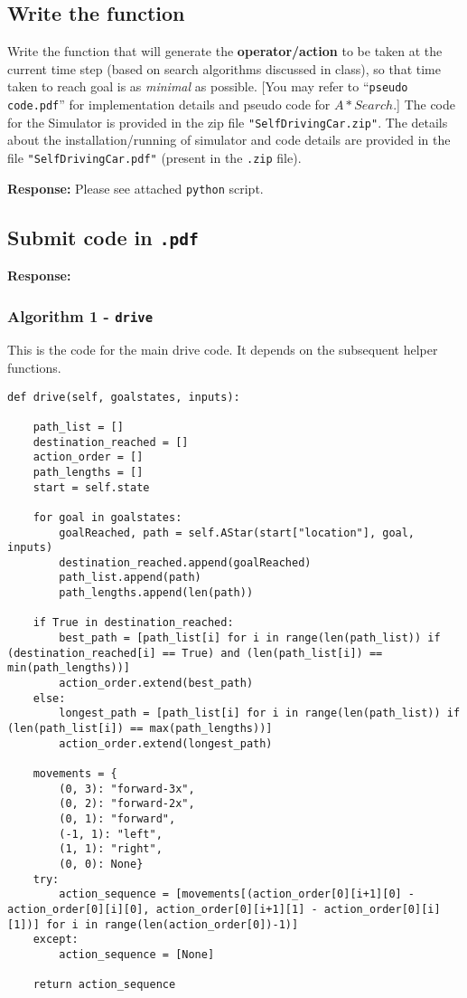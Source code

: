 \documentclass[12pt, letterpaper]{article}
\newcommand{\mybox}[1]{\par\noindent\colorbox{shadecolor}
{\parbox{\dimexpr\textwidth-2\fboxsep\relax}{#1}}}
\begin{document}
\subsection{Write the function}
\mybox{Write the function that will generate the \textbf{operator/action} to be taken at the current time step (based on search algorithms discussed in class), so that time taken to reach goal is as \textit{minimal} as possible. 
[You may refer to “\texttt{pseudo code.pdf}” for implementation details and pseudo code for $A* Search$.]
The code for the Simulator is provided in the zip file \texttt{"SelfDrivingCar.zip"}. The details about the
installation/running of simulator and code details are provided in the file \texttt{"SelfDrivingCar.pdf"}
(present in the \texttt{.zip} file).}

\textbf{Response:} Please see attached \texttt{python} script.

\subsection{Submit code in \texttt{.pdf}}

\textbf{Response:}

\subsubsection{Algorithm 1 - \texttt{drive}}

This is the code for the main drive code. It depends on the subsequent helper functions.

\begin{mdframed}[backgroundcolor=shadecolor]
\begin{verbatim}
def drive(self, goalstates, inputs):    
    
    path_list = []
    destination_reached = []
    action_order = []
    path_lengths = []
    start = self.state

    for goal in goalstates:
        goalReached, path = self.AStar(start["location"], goal, inputs)
        destination_reached.append(goalReached)
        path_list.append(path)
        path_lengths.append(len(path))
    
    if True in destination_reached:        
        best_path = [path_list[i] for i in range(len(path_list)) if (destination_reached[i] == True) and (len(path_list[i]) == min(path_lengths))]
        action_order.extend(best_path)
    else:        
        longest_path = [path_list[i] for i in range(len(path_list)) if (len(path_list[i]) == max(path_lengths))]
        action_order.extend(longest_path)

    movements = {
        (0, 3): "forward-3x", 
        (0, 2): "forward-2x", 
        (0, 1): "forward", 
        (-1, 1): "left", 
        (1, 1): "right", 
        (0, 0): None}
    try:
        action_sequence = [movements[(action_order[0][i+1][0] - action_order[0][i][0], action_order[0][i+1][1] - action_order[0][i][1])] for i in range(len(action_order[0])-1)]
    except:
        action_sequence = [None]
    
    return action_sequence
\end{verbatim}
\end{mdframed}
\end{document}
